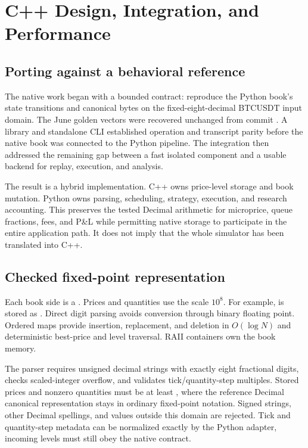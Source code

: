 \section{C++ Design, Integration, and Performance}

\subsection{Porting against a behavioral reference}

The native work began with a bounded contract: reproduce the Python book's
state transitions and canonical bytes on the fixed-eight-decimal BTCUSDT
input domain. The June golden vectors were recovered unchanged from commit
. A library and standalone CLI established operation and
transcript parity before the native book was connected to the Python pipeline.
The integration then addressed the remaining gap between a fast isolated
component and a usable backend for replay, execution, and analysis.

The result is a hybrid implementation. C++ owns price-level storage and book
mutation. Python owns parsing, scheduling, strategy, execution, and research
accounting. This preserves the tested Decimal arithmetic for microprice,
queue fractions, fees, and P\&L while permitting native storage to participate
in the entire application path. It does not imply that the whole simulator has
been translated into C++.

\subsection{Checked fixed-point representation}

Each book side is a . Prices and quantities use
the scale $10^8$. For example,  is stored as
. Direct digit parsing avoids conversion through binary
floating point. Ordered maps provide insertion, replacement, and deletion in
$O(\log N)$ and deterministic best-price and level traversal. RAII containers
own the book memory.

The parser requires unsigned decimal strings with exactly eight fractional
digits, checks scaled-integer overflow, and validates tick/quantity-step
multiples. Stored prices and nonzero quantities must be at least
, where the reference Decimal canonical representation stays
in ordinary fixed-point notation. Signed strings, other Decimal spellings, and
values outside this domain are rejected. Tick and quantity-step metadata can
be normalized exactly by the Python adapter, incoming levels must still obey
the native contract.

